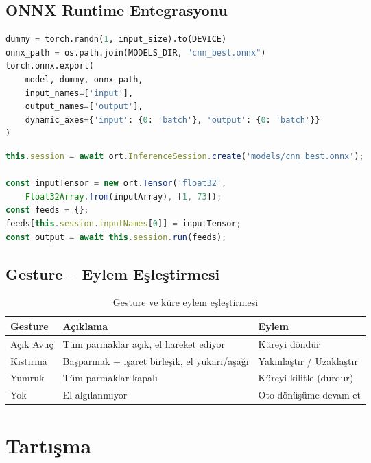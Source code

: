 \documentclass[12pt,a4paper]{article}
\begin{document}
\subsection{ONNX Runtime Entegrasyonu}

\begin{lstlisting}[language=Python, caption=Model ONNX ihracatı]
dummy = torch.randn(1, input_size).to(DEVICE)
onnx_path = os.path.join(MODELS_DIR, "cnn_best.onnx")
torch.onnx.export(
    model, dummy, onnx_path,
    input_names=['input'],
    output_names=['output'],
    dynamic_axes={'input': {0: 'batch'}, 'output': {0: 'batch'}}
)
\end{lstlisting}

\begin{lstlisting}[language=JavaScript, caption=ONNX Runtime Web ile model inference]
this.session = await ort.InferenceSession.create('models/cnn_best.onnx');

const inputTensor = new ort.Tensor('float32',
    Float32Array.from(inputArray), [1, 73]);
const feeds = {};
feeds[this.session.inputNames[0]] = inputTensor;
const output = await this.session.run(feeds);
\end{lstlisting}

\subsection{Gesture -- Eylem Eşleştirmesi}

\begin{table}[H]
\centering
\caption{Gesture ve küre eylem eşleştirmesi}
\begin{tabular}{@{}lll@{}}
\toprule
\textbf{Gesture} & \textbf{Açıklama} & \textbf{Eylem} \\
\midrule
Açık Avuç & Tüm parmaklar açık, el hareket ediyor & Küreyi döndür \\
Kıstırma & Başparmak + işaret birleşik, el yukarı/aşağı & Yakınlaştır / Uzaklaştır \\
Yumruk & Tüm parmaklar kapalı & Küreyi kilitle (durdur) \\
Yok & El algılanmıyor & Oto-dönüşüme devam et \\
\bottomrule
\end{tabular}
\end{table}

\section{Tartışma}
\end{document}
